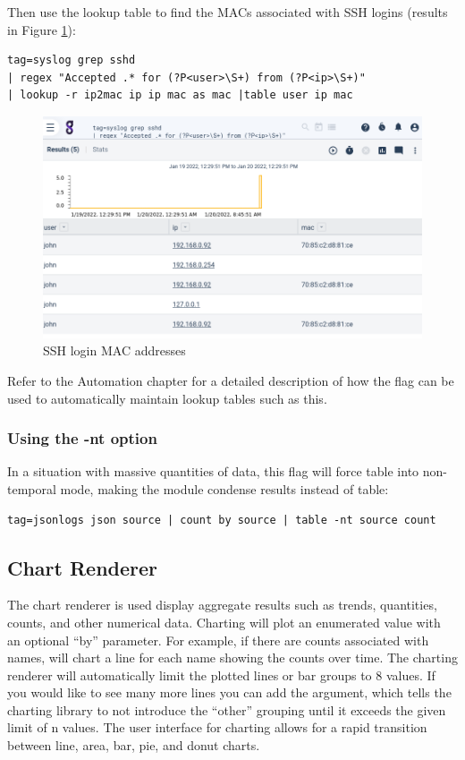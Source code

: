 Then use the lookup table to find the MACs associated with SSH
logins (results in Figure \ref{fig:ssh-login-macs}):

\begin{Verbatim}[breaklines=true]
tag=syslog grep sshd
| regex "Accepted .* for (?P<user>\S+) from (?P<ip>\S+)"
| lookup -r ip2mac ip ip mac as mac |table user ip mac
\end{Verbatim}

\begin{figure}
	\includegraphics[width=0.7\linewidth]{images/table-ssh-login.png}
	\caption{SSH login MAC addresses}
	\label{fig:ssh-login-macs}
\end{figure}

Refer to the Automation chapter for a detailed description of how the
 flag can be used to automatically maintain lookup tables such as
this.

\subsubsection{Using the -nt option}

In a situation with massive quantities of data, this flag will force table into
non-temporal mode, making the  module condense results instead of table:

\begin{Verbatim}[breaklines=true]
tag=jsonlogs json source | count by source | table -nt source count
\end{Verbatim}



\subsection{Chart Renderer}

The chart renderer is used display aggregate results such as trends,
quantities, counts, and other numerical data. Charting will plot an
enumerated value with an optional ``by'' parameter. For example, if
there are counts associated with names,  will
chart a line for each name showing the counts over time. The charting
renderer will automatically limit the plotted lines or bar groups to 8
values. If you would like to see many more lines you can add the 
argument, which tells the charting library
to not introduce the ``other'' grouping until it exceeds the given limit
of n values. The user interface for charting allows for a rapid
transition between line, area, bar, pie, and donut charts.

